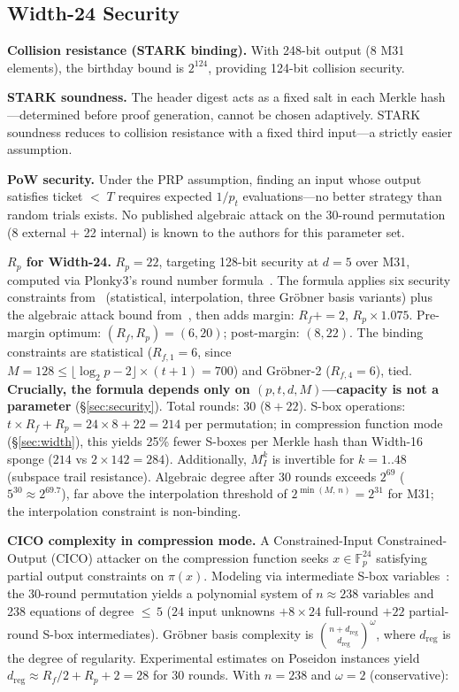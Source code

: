 \documentclass[11pt,a4paper]{article}
\begin{document}
\subsection{Width-24 Security}
\label{sec:width24sec}

\textbf{Collision resistance (STARK binding).} With 248-bit output (8 M31 elements), the birthday bound is $2^{124}$, providing 124-bit collision security.

\textbf{STARK soundness.} The header digest acts as a fixed salt in each Merkle hash---determined before proof generation, cannot be chosen adaptively. STARK soundness reduces to collision resistance with a fixed third input---a strictly easier assumption.

\textbf{PoW security.} Under the PRP assumption, finding an input whose output satisfies ticket ${<}\;T$ requires expected $1/p_t$ evaluations---no better strategy than random trials exists. No published algebraic attack on the 30-round permutation (8 external + 22 internal) is known to the authors for this parameter set.

\textbf{$R_p$ for Width-24.} $R_p = 22$, targeting 128-bit security at $d = 5$ over M31, computed via Plonky3's round number formula~\cite{plonky3}. The formula applies six security constraints from~\cite{poseidon,poseidon2} (statistical, interpolation, three Gr\"obner basis variants) plus the algebraic attack bound from~\cite{khovratovich2023}, then adds margin: $R_f \mathrel{{+}{=}} 2$, $R_p \times 1.075$. Pre-margin optimum: $(R_f, R_p) = (6, 20)$; post-margin: $(8, 22)$. The binding constraints are statistical ($R_{f,1} = 6$, since $M = 128 \leq \lfloor \log_2 p - 2 \rfloor \times (t+1) = 700$) and Gr\"obner-2 ($R_{f,4} = 6$), tied. \textbf{Crucially, the formula depends only on $(p, t, d, M)$---capacity is not a parameter} (\S\ref{sec:security}). Total rounds: 30 ($8 + 22$). S-box operations: $t \times R_f + R_p = 24 \times 8 + 22 = 214$ per permutation; in compression function mode (\S\ref{sec:width}), this yields 25\% fewer S-boxes per Merkle hash than Width-16 sponge ($214$ vs $2 \times 142 = 284$). Additionally, $M_I^k$ is invertible for $k = 1..48$ (subspace trail resistance). Algebraic degree after 30 rounds exceeds $2^{69}$ ($5^{30} \approx 2^{69.7}$), far above the interpolation threshold of $2^{\min(M,\, n)} = 2^{31}$ for M31; the interpolation constraint is non-binding.

\textbf{CICO complexity in compression mode.} A Constrained-Input Constrained-Output (CICO) attacker on the compression function seeks $x \in \mathbb{F}_p^{24}$ satisfying partial output constraints on $\pi(x)$. Modeling via intermediate S-box variables~\cite{poseidon}: the 30-round permutation yields a polynomial system of $n \approx 238$ variables and 238 equations of degree ${\leq}\,5$ ($24$ input unknowns $+ 8 \times 24$ full-round $+ 22$ partial-round S-box intermediates). Gr\"obner basis complexity is $\binom{n + d_{\mathrm{reg}}}{d_{\mathrm{reg}}}^{\omega}$, where $d_{\mathrm{reg}}$ is the degree of regularity. Experimental estimates on Poseidon instances yield $d_{\mathrm{reg}} \approx R_f/2 + R_p + 2 = 28$ for 30 rounds. With $n = 238$ and $\omega = 2$ (conservative):
\end{document}
